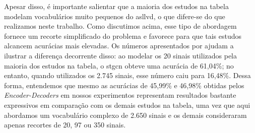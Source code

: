 Apesar disso, é importante salientar que a maioria dos estudos na tabela modelam vocabulários muito pequenos do \acrshort{asllvd}, o que difere-se do que realizamos neste trabalho. Como discutimos acima, esse tipo de abordagem fornece um recorte simplificado do problema e favorece para que tais estudos alcancem acurácias mais elevadas.
Os números apresentados por  ajudam a ilustrar a diferença decorrente disso: ao modelar os 20 sinais utilizados pela maioria dos estudos na tabela, o \acrshort{stgcn} obteve uma acurácia de 61,04\%; no entanto, quando utilizados os 2.745 sinais, esse número caiu para 16,48\%.
Dessa forma, entendemos que mesmo as acurácias de 45,99\% e 46,98\% obtidas pelos \textit{Encoder-Decoders} em nossos experimentos representam resultados bastante expressivos em comparação com os demais estudos na tabela, uma vez que aqui abordamos um vocabulário complexo de 2.650 sinais e os demais consideraram apenas recortes de 20, 97 ou 350 sinais.











